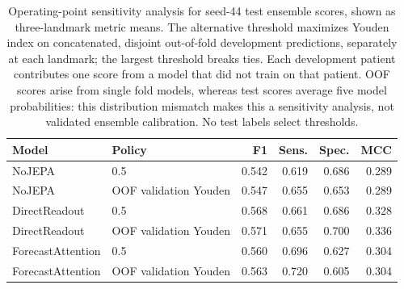 \begin{table}[t]
\centering
\small
\caption{Operating-point sensitivity analysis for seed-44 test ensemble scores, shown as three-landmark metric means. The alternative threshold maximizes Youden index on concatenated, disjoint out-of-fold development predictions, separately at each landmark; the largest threshold breaks ties. Each development patient contributes one score from a model that did not train on that patient. OOF scores arise from single fold models, whereas test scores average five model probabilities: this distribution mismatch makes this a sensitivity analysis, not validated ensemble calibration. No test labels select thresholds.}
\label{tab:extended_threshold}
\begin{tabular}{llrrrr}
\toprule
Model & Policy & F1 & Sens. & Spec. & MCC \\
\midrule
NoJEPA & 0.5 & 0.542 & 0.619 & 0.686 & 0.289 \\
NoJEPA & OOF validation Youden & 0.547 & 0.655 & 0.653 & 0.289 \\
\midrule
DirectReadout & 0.5 & 0.568 & 0.661 & 0.686 & 0.328 \\
DirectReadout & OOF validation Youden & 0.571 & 0.655 & 0.700 & 0.336 \\
\midrule
ForecastAttention & 0.5 & 0.560 & 0.696 & 0.627 & 0.304 \\
ForecastAttention & OOF validation Youden & 0.563 & 0.720 & 0.605 & 0.304 \\
\bottomrule
\end{tabular}
\end{table}
